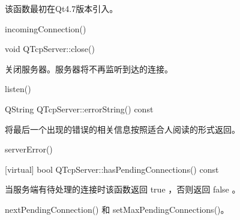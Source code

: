 该函数最初在Qt4.7版本引入。

\begin{notice}[另请参阅]
incomingConnection() 
\end{notice}

void QTcpServer::close()

关闭服务器。服务器将不再监听到达的连接。

\begin{notice}[另请参阅]
 listen() 
\end{notice}

QString QTcpServer::errorString() const

将最后一个出现的错误的相关信息按照适合人阅读的形式返回。


\begin{notice}[另请参阅]
serverError() 
\end{notice}


[virtual] bool QTcpServer::hasPendingConnections() const

当服务端有待处理的连接时该函数返回 true ，否则返回 false 。

\begin{notice}[另请参阅]
nextPendingConnection() 和 setMaxPendingConnections()。
\end{notice}







